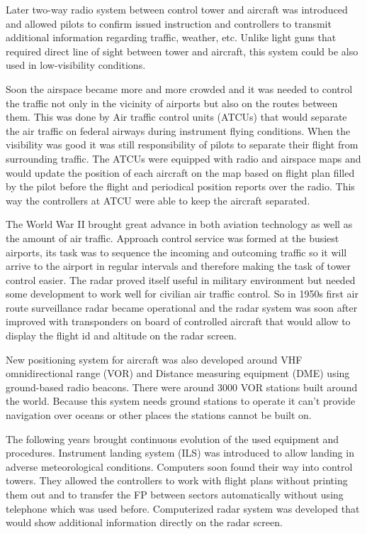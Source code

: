 Later two-way radio system between control tower and aircraft was introduced and allowed pilots to confirm issued instruction and controllers to transmit additional information regarding traffic, weather, etc. Unlike light guns that required direct line of sight between tower and aircraft, this system could be also used in low-visibility conditions.

Soon the airspace became more and more crowded and it was needed to control the traffic not only in the vicinity of airports but also on the routes between them. This was done by Air traffic control units (ATCUs) that would separate the air traffic on federal airways during instrument flying conditions. When the visibility was good it was still responsibility of pilots to separate their flight from surrounding traffic. The ATCUs were equipped with radio and airspace maps and would update the position of each aircraft on the map based on flight plan filled by the pilot before the flight and periodical position reports over the radio. This way the controllers at ATCU were able to keep the aircraft separated.

The World War II brought great advance in both aviation technology as well as the amount of air traffic. Approach control service was formed at the busiest airports, its task was to sequence the incoming and outcoming traffic so it will arrive to the airport in regular intervals and therefore making the task of tower control easier. The radar proved itself useful in military environment but needed some development to work well for civilian air traffic control. So in 1950s first air route surveillance radar became operational and the radar system was soon after improved with transponders on board of controlled aircraft that would allow to display the flight id and altitude on the radar screen.

New positioning system for aircraft was also developed around VHF omnidirectional range (VOR) and Distance measuring equipment (DME) using ground-based radio beacons. There were around 3000 VOR stations built around the world.\cite{vor} Because this system needs ground stations to operate it can't provide navigation over oceans or other places the stations cannot be built on.

The following years brought continuous evolution of the used equipment and procedures. Instrument landing system (ILS) was introduced to allow landing in adverse meteorological conditions. Computers soon found their way into control towers. They allowed the controllers to work with flight plans without printing them out and to transfer the FP between sectors automatically without using telephone which was used before. Computerized radar system was developed that would show additional information directly on the radar screen.

